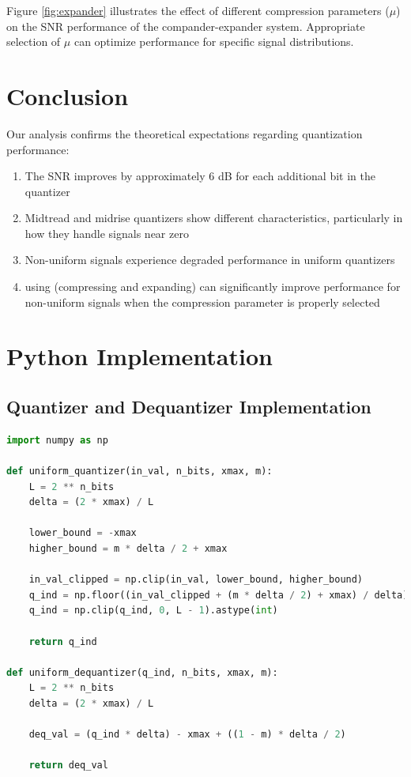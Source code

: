 \documentclass{article}
\begin{document}
Figure \ref{fig:expander} illustrates the effect of different compression parameters ($\mu$) on the SNR performance of the compander-expander system. Appropriate selection of $\mu$ can optimize performance for specific signal distributions.

\section{Conclusion}

Our analysis confirms the theoretical expectations regarding quantization performance:

\begin{enumerate}
    \item The SNR improves by approximately 6 dB for each additional bit in the quantizer
    \item Midtread and midrise quantizers show different characteristics, particularly in how they handle signals near zero
    \item Non-uniform signals experience degraded performance in uniform quantizers
    \item using (compressing and expanding) can significantly improve performance for non-uniform signals when the compression parameter is properly selected
\end{enumerate}

\appendix

\section{Python Implementation}
\subsection{Quantizer and Dequantizer Implementation}

\begin{lstlisting}[language=Python, caption=Uniform Quantizer and Dequantizer Functions]
import numpy as np

def uniform_quantizer(in_val, n_bits, xmax, m):
    L = 2 ** n_bits
    delta = (2 * xmax) / L
    
    lower_bound = -xmax
    higher_bound = m * delta / 2 + xmax
    
    in_val_clipped = np.clip(in_val, lower_bound, higher_bound)
    q_ind = np.floor((in_val_clipped + (m * delta / 2) + xmax) / delta)
    q_ind = np.clip(q_ind, 0, L - 1).astype(int)
    
    return q_ind

def uniform_dequantizer(q_ind, n_bits, xmax, m):
    L = 2 ** n_bits
    delta = (2 * xmax) / L
    
    deq_val = (q_ind * delta) - xmax + ((1 - m) * delta / 2)
    
    return deq_val
\end{lstlisting}
\end{document}
